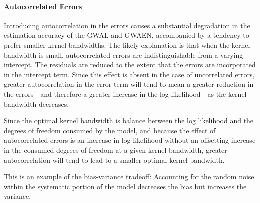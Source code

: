 \documentclass[authoryear, review, 11pt]{elsarticle}
\begin{document}
	\paragraph{Autocorrelated Errors} Introducing autocorrelation in the errors causes a substantial degradation in the estimation accuracy of the GWAL and GWAEN, accompanied by a tendency to prefer smaller kernel bandwidths. The likely explanation is that when the kernel bandwidth is small, autocorrelated errors are indistinguishable from a varying intercept. The residuals are reduced to the extent that the errors are incorporated in the intercept term. Since this effect is absent in the case of uncorrelated errors, greater autocorrelation in the error term will tend to mean a greater reduction in the errors - and therefore a greater increase in the log likelihood - as the kernel bandwidth decreases.
	
	Since the optimal kernel bandwidth is balance between the log likelihood and the degrees of freedom consumed by the model, and because the effect of autocorrelated errors is an increase in log likelihood without an offsetting increase in the consumed degrees of freedom at a given kernel bandwidth, greater autocorrelation will tend to lead to a smaller optimal kernel bandwidth.
	
	This is an example of the bias-variance tradeoff: Accounting for the random noise within the systematic portion of the model decreases the bias but increases the variance.
	
	
	
\end{document}
